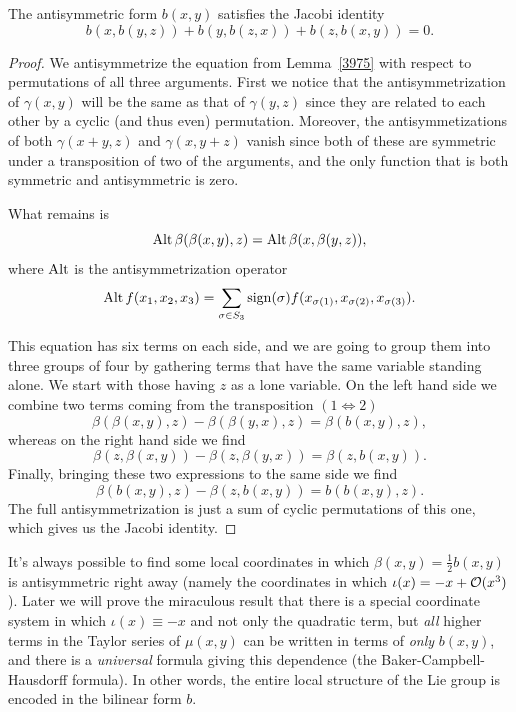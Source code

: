\begin{lem}
    The antisymmetric form $b(x,y)$ satisfies the Jacobi identity
    \[b(x,b(y,z))+b(y,b(z,x))+b(z,b(x,y))=0.\]
\end{lem}
\begin{proof}
    We antisymmetrize the equation from Lemma~\ref{3975} with respect to permutations of all three arguments. First we notice that the antisymmetrization of $\gamma(x,y)$ will be the same as that of $\gamma(y,z)$ since they are related to each other by a cyclic (and thus even) permutation. Moreover, the antisymmetizations of both $\gamma(x+y,z)$ and $\gamma(x,y+z)$ vanish since both of these are symmetric under a transposition of two of the arguments, and the only function that is both symmetric and antisymmetric is zero.

    What remains is 
    \[\operatorname{Alt} \beta(\beta(x,y),z)=\operatorname{Alt} \beta(x,\beta(y,z)),\]
    where $\operatorname{Alt}$ is the antisymmetrization operator 
    \[\operatorname{Alt} f(x_1,x_2,x_3)=\sum_{\sigma\in S_3}\operatorname{sign}(\sigma)f(x_{\sigma(1)},x_{\sigma(2)},x_{\sigma(3)}).\]

    This equation has six terms on each side, and we are going to group them into three groups of four by gathering terms that have the same variable standing alone. We start with those having $z$ as a lone variable. On the left hand side we combine two terms coming from the transposition $(1\Leftrightarrow2)$
    \[\beta(\beta(x,y),z)-\beta(\beta(y,x),z)=\beta(b(x,y),z),\]
    whereas on the right hand side we find
    \[\beta(z,\beta(x,y))-\beta(z,\beta(y,x))=\beta(z,b(x,y)).\]
    Finally, bringing these two expressions to the same side we find
    \[\beta(b(x,y),z)-\beta(z,b(x,y))=b(b(x,y),z).\]
    The full antisymmetrization is just a sum of cyclic permutations of this one, which gives us the Jacobi identity.
\end{proof}

\begin{rem}
    It's always possible to find some local coordinates in which $\beta(x,y)=\frac12 b(x,y)$ is antisymmetric right away (namely the coordinates in which $\iota(x)=-x+\mathcal{O}(x^3)$). Later we will prove the miraculous result that there is a special coordinate system in which $\iota(x)\equiv-x$ and not only the quadratic term, but \emph{all} higher terms in the Taylor series of $\mu(x,y)$ can be written in terms of \emph{only} $b(x,y)$, and there is a \emph{universal} formula giving this dependence (the Baker-Campbell-Hausdorff formula). In other words, the entire local structure of the Lie group is encoded in the bilinear form $b$.
\end{rem}



